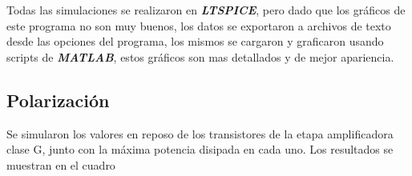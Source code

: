 
Todas las simulaciones se realizaron en \textbf{\textit{LTSPICE}}, pero dado que los gráficos de este programa no son muy buenos, los datos se exportaron a archivos de texto desde las opciones del programa, los mismos se cargaron y graficaron usando scripts de \textbf{\textit{MATLAB}}, estos gráficos son mas detallados y de mejor apariencia.\\


\subsection{Polarización}

\par Se simularon los valores en reposo de los transistores de la etapa amplificadora clase G, junto con la máxima potencia disipada en cada uno. Los resultados se muestran en el cuadro ~\\

